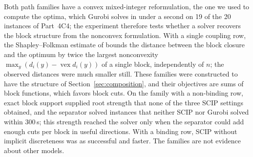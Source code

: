 Both path families have a convex mixed-integer reformulation, the one we used
to compute the optima, which Gurobi solves in under a second on 19 of the 20
instances of Part~4C4; the experiment therefore tests whether a solver
recovers the block structure from the nonconvex formulation. With a single
coupling row, the Shapley--Folkman estimate of \citet{AubinEkeland1976} bounds
the distance between the block closure and the optimum by twice the largest
nonconvexity $\max_y(d_i(y)-\operatorname{vex}d_i(y))$ of a single block,
independently of $n$; the observed distances were much smaller still. These
families were constructed to have the structure of
Section~\ref{sec:composition}, and their objectives are sums of block
functions, which favors block cuts. On the family with a non-binding row,
exact block support supplied root strength that none of the three SCIP
settings obtained, and the separator solved instances that neither SCIP nor
Gurobi solved within 300\,s; this strength reached the solver only when the
separator could add enough cuts per block in useful directions. With a binding
row, SCIP without implicit discreteness was as successful and faster. The
families are not evidence about other models.
